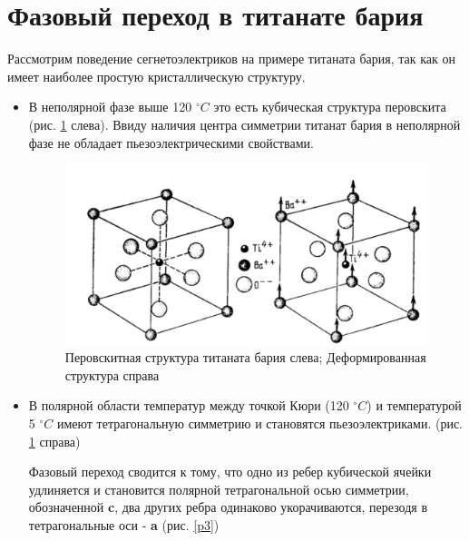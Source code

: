\documentclass[a4paper]{article}
\begin{document}
\section{Фазовый переход в титанате бария}

Рассмотрим поведение сегнетоэлектриков на примере титаната бария, так как он имеет наиболее простую кристаллическую структуру. 

\begin{itemize}

\item

В неполярной фазе выше 120 $^{\circ} C$ это есть кубическая структура перовскита (рис. \ref{p2} слева).  Ввиду наличия центра симметрии титанат бария в неполярной фазе не обладает пьезоэлектрическими свойствами. 

\begin{figure}[H]
\begin{center}
\includegraphics[scale = 0.7]{p2.png}

\caption{Перовскитная структура титаната бария слева; Деформированная структура справа}
\label{p2}
\end{center}
\end{figure}

\item

В полярной области температур между точкой Кюри (120 $^{\circ} C$) и температурой 5 $^{\circ} C$ имеют тетрагональную симметрию и становятся пьезоэлектриками. (рис. \ref{p2} справа)

Фазовый переход сводится к тому, что одно из ребер кубической ячейки удлиняется и становится полярной тетрагональной осью симметрии, обозначенной \textbf{c}, два других ребра одинаково укорачиваются, перезодя в тетрагональные оси - \textbf{a} (рис. \ref{p3})


\end{itemize}
\end{document}
